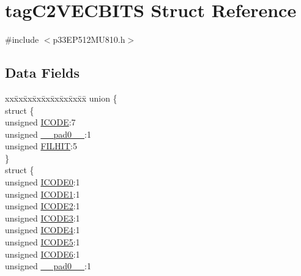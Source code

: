 \hypertarget{structtag_c2_v_e_c_b_i_t_s}{}\section{tag\+C2\+V\+E\+C\+B\+I\+TS Struct Reference}
\label{structtag_c2_v_e_c_b_i_t_s}


{\ttfamily \#include $<$p33\+E\+P512\+M\+U810.\+h$>$}

\subsection*{Data Fields}
\begin{DoxyCompactItemize}
\item 
\begin{tabbing}
xx\=xx\=xx\=xx\=xx\=xx\=xx\=xx\=xx\=\kill
union \{\\
\>struct \{\\
\>\>unsigned \hyperlink{structtag_c2_v_e_c_b_i_t_s_a7c445e6c602ab0d39d6a30ba56be353c}{ICODE}:7\\
\>\>unsigned \hyperlink{structtag_c2_v_e_c_b_i_t_s_adf71f3d8410c1f1dbbc96680a92c49af}{\_\_pad0\_\_}:1\\
\>\>unsigned \hyperlink{structtag_c2_v_e_c_b_i_t_s_af516176ac93a65e20c10fc4f03eca15b}{FILHIT}:5\\
\>\} \\
\>struct \{\\
\>\>unsigned \hyperlink{structtag_c2_v_e_c_b_i_t_s_ae58a73de898f481f87a7659a557a16d5}{ICODE0}:1\\
\>\>unsigned \hyperlink{structtag_c2_v_e_c_b_i_t_s_ab9c9f20dcc5c97d353556f665f96c3ca}{ICODE1}:1\\
\>\>unsigned \hyperlink{structtag_c2_v_e_c_b_i_t_s_a7b87cd62d9b4d47b4835bbfd3d83c0c8}{ICODE2}:1\\
\>\>unsigned \hyperlink{structtag_c2_v_e_c_b_i_t_s_a00f39c3c36b114bcd0f0c93255c5dc39}{ICODE3}:1\\
\>\>unsigned \hyperlink{structtag_c2_v_e_c_b_i_t_s_a436cd58140bad7a64953df17114bb50e}{ICODE4}:1\\
\>\>unsigned \hyperlink{structtag_c2_v_e_c_b_i_t_s_af29df0fe9fa862b03f7a3dc52a2fcca5}{ICODE5}:1\\
\>\>unsigned \hyperlink{structtag_c2_v_e_c_b_i_t_s_aec0244cced0a8f2c1703bb463f77de4b}{ICODE6}:1\\
\>\>unsigned \hyperlink{structtag_c2_v_e_c_b_i_t_s_adf71f3d8410c1f1dbbc96680a92c49af}{\_\_pad0\_\_}:1\\

\end{tabbing}
\end{DoxyCompactItemize}
